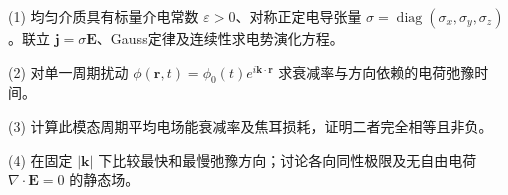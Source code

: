 (1) 均匀介质具有标量介电常数 \(\varepsilon>0\)、对称正定电导张量 \(\sigma=\operatorname{diag}(\sigma_x,\sigma_y,\sigma_z)\)。联立 \(\mathbf j=\sigma\mathbf E\)、Gauss定律及连续性求电势演化方程。

(2) 对单一周期扰动 \(\phi(\mathbf r,t)=\phi_0(t)e^{i\mathbf k\cdot\mathbf r}\) 求衰减率与方向依赖的电荷弛豫时间。

(3) 计算此模态周期平均电场能衰减率及焦耳损耗，证明二者完全相等且非负。

(4) 在固定 \(|\mathbf k|\) 下比较最快和最慢弛豫方向；讨论各向同性极限及无自由电荷 \(\nabla\cdot\mathbf E=0\) 的静态场。
